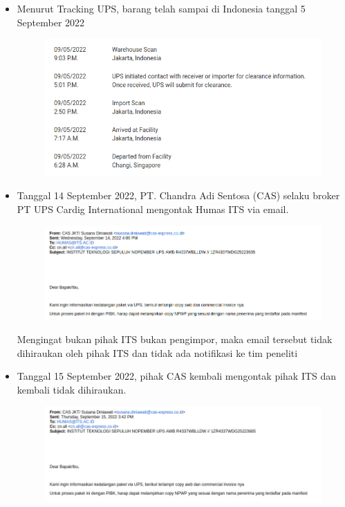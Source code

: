 \documentclass{article} %
\begin{document}
	\begin{itemize}
		\item Menurut Tracking UPS, barang telah sampai di Indonesia tanggal 5 September 2022

		\begin{figure}[!ht]
			\centering
			\includegraphics[width=400pt]{images/impor_0}
		\end{figure}

		\item Tanggal 14 September 2022, PT. Chandra Adi Sentosa (CAS) selaku broker PT UPS Cardig International mengontak Humas ITS via email.

		\begin{figure}[!ht]
			\centering
			\includegraphics[width=400pt]{images/impor_1}
		\end{figure}

		Mengingat bukan pihak ITS bukan pengimpor, maka email tersebut tidak dihiraukan oleh pihak ITS dan tidak ada notifikasi ke tim peneliti

		\item Tanggal 15 September 2022, pihak CAS kembali mengontak pihak ITS dan kembali tidak dihiraukan.

		\begin{figure}[!ht]
			\centering
			\includegraphics[width=400pt]{images/impor_2}
		\end{figure}


\end{itemize}
\end{document}
